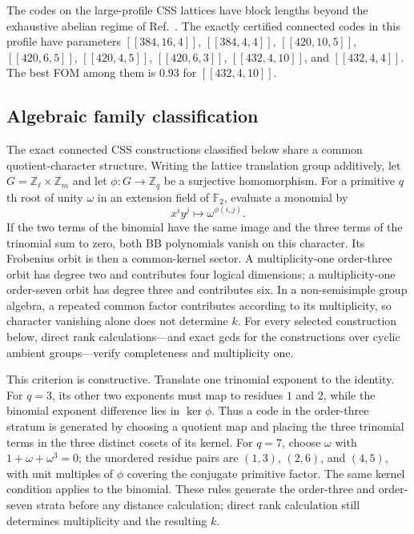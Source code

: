 \documentclass[aps,prx,twocolumn,superscriptaddress,nofootinbib,floatfix]{revtex4-2}
\newcommand{\FF}{\ensuremath{\mathbb{F}}}
\newcommand{\code}[1]{\ensuremath{\left[\!\left[#1\right]\!\right]}}
\begin{document}
The codes on the large-profile CSS lattices have block lengths beyond the
exhaustive abelian regime of Ref.~\cite{lin2024twoblock}.  The exactly certified
connected codes in this profile have parameters $\code{384,16,4}$,
$\code{384,4,4}$,
$\code{420,10,5}$, $\code{420,6,5}$, $\code{420,4,5}$,
$\code{420,6,3}$, $\code{432,4,10}$, and $\code{432,4,4}$.  The best FOM
among them is $0.93$ for $\code{432,4,10}$.

\subsection{Algebraic family classification}
\label{sec:algebraic-classification}

The exact connected CSS constructions classified below share a common
quotient-character structure.  Writing the lattice translation group
additively, let
$G=\mathbb Z_\ell\times\mathbb Z_m$ and let
$\phi:G\to\mathbb Z_q$ be a surjective homomorphism.  For a primitive
$q$th root of unity $\omega$ in an extension field of $\FF_2$, evaluate a
monomial by
\begin{equation}
 x^i y^j\longmapsto \omega^{\phi(i,j)}.
 \label{eq:quotient-character}
\end{equation}
If the two terms of the binomial have the same image and the three terms of
the trinomial sum to zero, both BB polynomials vanish on this character.  Its
Frobenius orbit is then a common-kernel sector.  A multiplicity-one order-three
orbit has degree two and contributes four logical dimensions; a
multiplicity-one order-seven orbit has degree three and contributes six.  In a
non-semisimple group algebra, a repeated common factor contributes according
to its multiplicity, so character vanishing alone does not determine $k$.  For
every selected construction below, direct rank calculations---and exact gcds
for the constructions over cyclic ambient groups---verify completeness and
multiplicity one.

This criterion is constructive.  Translate one trinomial exponent to the
identity.  For $q=3$, its other two exponents must map to residues $1$ and $2$,
while the binomial exponent difference lies in $\ker\phi$.  Thus a code in the
order-three stratum is generated by choosing a quotient map and placing the three
trinomial terms in the three distinct cosets of its kernel.  For $q=7$, choose
$\omega$ with $1+\omega+\omega^3=0$; the unordered residue pairs are
$(1,3)$, $(2,6)$, and $(4,5)$, with unit multiples of $\phi$ covering the
conjugate primitive factor.  The same kernel condition applies to the
binomial.  These rules generate the order-three and order-seven strata before
any distance calculation; direct rank calculation still determines
multiplicity and the resulting $k$.
\end{document}
